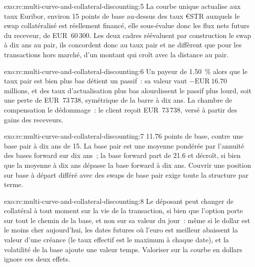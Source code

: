 \begin{solution}{exo:rc:multi-curve-and-collateral-discounting:5}
La courbe unique actualise aux taux Euribor, environ 15 points de base au-dessus des
taux €STR auxquels le swap collatéralisé est réellement financé, elle sous-évalue donc
les flux nets futurs du receveur, de EUR~60\,300. Les deux cadres réévaluent par construction le
swap à dix ans au pair, ils concordent donc au taux pair et ne diffèrent que pour les
transactions hors marché, d'un montant qui croît avec
la distance au pair.
\end{solution}

\begin{solution}{exo:rc:multi-curve-and-collateral-discounting:6}
Un payeur de 1.50~\% alors que le taux pair est bien plus bas détient un passif~: sa valeur
vaut $-\text{EUR}~16.70$ millions, et des taux d'actualisation plus bas alourdissent le passif
plus lourd, soit une perte de EUR~73\,738, symétrique de la barre à dix ans. La chambre
de compensation le dédommage~: le client reçoit EUR~73\,738, versé à partir des
gains des receveurs.
\end{solution}

\begin{solution}{exo:rc:multi-curve-and-collateral-discounting:7}
11.76 points de base, contre une base pair à dix ans de 15. La base pair est une moyenne
pondérée par l'annuité des bases forward sur dix ans~; la base forward part de 21.6 et
décroît, si bien que la moyenne à dix ans dépasse la base forward à dix ans. Couvrir une
position sur base à départ différé avec des swaps de base pair exige toute
la structure par terme.
\end{solution}

\begin{solution}{exo:rc:multi-curve-and-collateral-discounting:8}
Le déposant peut changer de collatéral à tout moment sur la vie de la transaction, si bien
que l'option porte sur tout le chemin de la base, et non sur sa valeur du jour~: même si le
dollar est le moins cher aujourd'hui, les dates futures où l'euro est meilleur abaissent la
valeur d'une créance (le taux effectif est le maximum à chaque date), et la volatilité de la
base ajoute une valeur temps. Valoriser sur la courbe en dollars ignore ces deux effets.
\end{solution}


